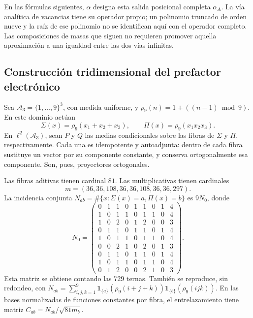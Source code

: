En las fórmulas siguientes, \(\alpha\) designa esta salida posicional
completa \(\alpha_A\). La vía analítica de vacancias tiene su operador
propio; un polinomio truncado de orden nueve y la raíz de ese polinomio
no se identifican aquí con el operador completo. Las composiciones de
masas que siguen no requieren promover aquella aproximación a una
igualdad entre las dos vías infinitas.

\subsection{Construcción tridimensional del prefactor electrónico}
\label{vi:vi:dep:prefactor}

Sea \(\mathcal A_3=\{1,\ldots,9\}^3\), con medida uniforme, y
\(\rho_9(n)=1+((n-1)\bmod9)\). En este dominio actúan
\[
 \Sigma(x)=\rho_9(x_1+x_2+x_3),\qquad
 \Pi(x)=\rho_9(x_1x_2x_3).
\]
En \(\ell^2(\mathcal A_3)\), sean \(P\) y \(Q\) las medias
condicionales sobre las fibras de \(\Sigma\) y \(\Pi\),
respectivamente. Cada una es idempotente y autoadjunta: dentro de cada
fibra sustituye un vector por su componente constante, y conserva
ortogonalmente esa componente. Son, pues, proyectores ortogonales.

Las fibras aditivas tienen cardinal \(81\). Las multiplicativas tienen
cardinales
\[
m=(36,36,108,36,36,108,36,36,297).
\]
La incidencia conjunta
\(N_{ab}=\#\{x:\Sigma(x)=a,\Pi(x)=b\}\) es \(9N_0\), donde
\begin{equation}
 N_0=\begin{pmatrix}
0&1&1&0&1&1&0&1&4\\1&0&1&1&0&1&1&0&4\\
1&0&2&0&1&2&0&0&3\\0&1&1&0&1&1&0&1&4\\
1&0&1&1&0&1&1&0&4\\0&0&2&1&0&2&0&1&3\\
0&1&1&0&1&1&0&1&4\\1&0&1&1&0&1&1&0&4\\
0&1&2&0&0&2&1&0&3
\end{pmatrix}.
 \label{vi:vi:dep:incidencia-cubica}
\end{equation}
Esta matriz se obtiene contando las \(729\) ternas. También se
reproduce, sin redondeo, con
\(N_{ab}=\sum_{i,j,k=1}^9
\mathbf1_{\{a\}}(\rho_9(i+j+k))
\mathbf1_{\{b\}}(\rho_9(ijk))\).
En las bases normalizadas de funciones constantes por fibra, el
entrelazamiento tiene matriz \(C_{ab}=N_{ab}/\sqrt{81m_b}\).


